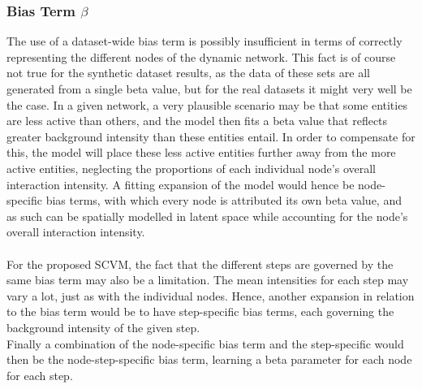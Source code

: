 \subsubsection{Bias Term $\beta$}
\label{sec:Discussion:Results:BiasTerm}
The use of a dataset-wide bias term is possibly insufficient in terms of correctly representing the different nodes of the dynamic network. 
This fact is of course not true for the synthetic dataset results, as the data of these sets are all generated from a single beta value, but for the real datasets it might very well be the case.
In a given network, a very plausible scenario may be that some entities are less active than others, and the model then fits a beta value that reflects greater background intensity than these entities entail.
In order to compensate for this, the model will place these less active entities further away from the more active entities, neglecting the proportions of each individual node's overall interaction intensity.
A fitting expansion of the model would hence be node-specific bias terms, with which every node is attributed its own beta value, and as such can be spatially modelled in latent space while accounting for the node's overall interaction intensity. 
\\\\
For the proposed SCVM, the fact that the different steps are governed by the same bias term may also be a limitation. 
The mean intensities for each step may vary a lot, just as with the individual nodes.
Hence, another expansion in relation to the bias term would be to have step-specific bias terms, each governing the background intensity of the given step.
\\
Finally a combination of the node-specific bias term and the step-specific would then be the node-step-specific bias term, learning a beta parameter for each node for each step.


